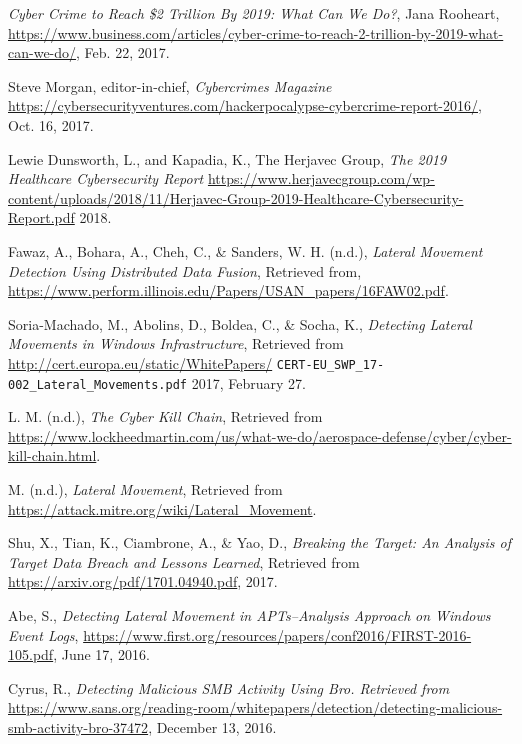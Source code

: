 \documentclass[sigconf]{acmart}
\begin{document}
\begin{thebibliography}{9}

\textit{Cyber Crime to Reach \$2 Trillion By 2019: What Can We Do?},
Jana Rooheart,
\url{https://www.business.com/articles/cyber-crime-to-reach-2-trillion-by-2019-what-can-we-do/},
Feb. 22, 2017.

Steve Morgan, editor-in-chief, \textit{Cybercrimes Magazine}
\url{https://cybersecurityventures.com/hackerpocalypse-cybercrime-report-2016/},
Oct. 16, 2017.

Lewie Dunsworth, L., and Kapadia, K.,
The Herjavec Group,
\textit{The 2019 Healthcare Cybersecurity Report}
\url{https://www.herjavecgroup.com/wp-content/uploads/2018/11/Herjavec-Group-2019-Healthcare-Cybersecurity-Report.pdf}
2018.

 Fawaz, A., Bohara, A., Cheh, C., \& Sanders, W. H. (n.d.),
 \textit{Lateral Movement Detection Using Distributed Data Fusion},
 Retrieved from,
 \url{https://www.perform.illinois.edu/Papers/USAN\_papers/16FAW02.pdf}.

 Soria-Machado, M., Abolins, D., Boldea, C., \& Socha, K.,
 \textit{Detecting Lateral Movements in Windows Infrastructure},
 Retrieved from \url{http://cert.europa.eu/static/WhitePapers/}
 \texttt{CERT-EU\_SWP\_17-002\_Lateral\_Movements.pdf}
 2017, February 27.

 L. M. (n.d.),
 \textit{The Cyber Kill Chain}, Retrieved from
 \url{https://www.lockheedmartin.com/us/what-we-do/aerospace-defense/cyber/cyber-kill-chain.html}.

 M. (n.d.),
 \textit{Lateral Movement},
 Retrieved from \url{https://attack.mitre.org/wiki/Lateral\_Movement}.

 Shu, X., Tian, K., Ciambrone, A., \& Yao, D.,
 \textit{Breaking the Target: An Analysis of Target Data Breach and Lessons Learned},
 Retrieved from \url{https://arxiv.org/pdf/1701.04940.pdf},
 2017.
 
 Abe, S.,
 \textit{Detecting Lateral Movement in APTs--Analysis Approach}
 \textit{on Windows Event Logs},
 \url{https://www.first.org/resources/papers/conf2016/FIRST-2016-105.pdf},
 June 17, 2016.

 Cyrus, R.,
 \textit{Detecting Malicious SMB Activity Using Bro. Retrieved from }\url{https://www.sans.org/reading-room/whitepapers/detection/detecting-malicious-smb-activity-bro-37472},
 December 13, 2016.


\end{thebibliography}
\end{document}
